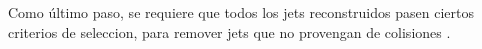 




Como último paso, se requiere que todos los jets reconstruidos pasen ciertos
criterios de seleccion, para remover jets que no provengan de colisiones \cite{Aad:2010ad,ATLAS-CONF-2010-038}.






